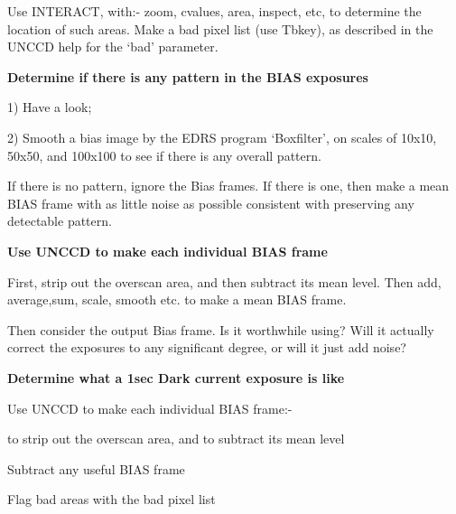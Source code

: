 {{ Use  INTERACT, with:- zoom, cvalues, area, inspect, etc, to determine
 the location of such areas. Make a bad pixel list (use Tbkey),
 as described in the UNCCD help for the `bad' parameter.
                                                                               
                                                                               
{\hspace*{4ex} \bf   Determine if there is any pattern in the BIAS exposures}
                                                                               
 1) Have a look;

 2) Smooth a bias image by the EDRS program `Boxfilter', on scales of
    10x10, 50x50, and 100x100 to see if there is any overall pattern.
                                                                               
 If there is no pattern, ignore the Bias frames. If there is one, then
 make a mean BIAS frame with as little noise as possible consistent
 with preserving any detectable pattern.
                                                                               
{\hspace*{4ex} \bf    Use UNCCD to make each individual BIAS frame}

  First, strip out the overscan area, and then subtract its mean level.
 Then add, average,sum, scale, smooth etc. to make a mean BIAS frame.
                                                                               
 Then consider the output Bias frame. Is it worthwhile using? Will 
 it actually correct the exposures to any significant degree, or
 will it just add noise?
                                                                               
                                                                               
{\hspace*{4ex} \bf  Determine what a 1sec Dark current exposure is like}
                                                                               
 Use UNCCD to make each individual BIAS frame:-

\begin{list}{{-}}{}
\item to strip out the overscan area, and to subtract its mean level
\item Subtract any useful BIAS frame
\item Flag bad areas with the bad pixel list
\end{list}
                                                                               
}}
